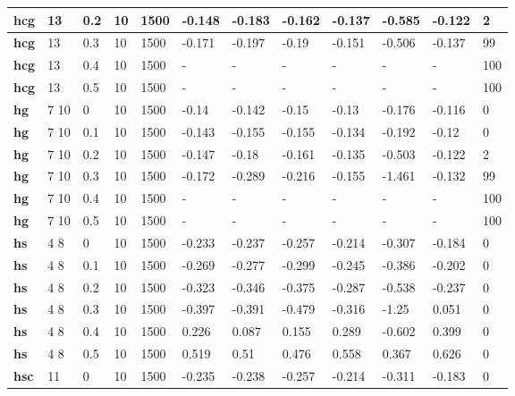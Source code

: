 \begin{longtable}[h]{|p{0.8cm}|p{1.5cm}|p{1cm}|p{1cm}|p{1cm}|p{1cm}|p{1cm}|p{1cm}|p{1cm}|p{1cm}|p{1cm}|p{1.5cm}|}
    \\ \hline
  \textbf{hcg } &  13         & 0.2 & 10 & 1500 & -0.148 & -0.183 & -0.162 & -0.137 & -0.585 & -0.122 &   2
    \\ \hline
  \textbf{hcg } &  13         & 0.3 & 10 & 1500 & -0.171 & -0.197 &  -0.19 & -0.151 & -0.506 & -0.137 &  99
    \\ \hline
  \textbf{hcg } &  13         & 0.4 & 10 & 1500 & - & - & - & - & - & - & 100
    \\ \hline
  \textbf{hcg } &  13         & 0.5 & 10 & 1500 & - & - & - & - & - & - & 100
    \\ \hline
  \textbf{hg  } &  7 10       &   0 & 10 & 1500 &  -0.14 & -0.142 &  -0.15 &  -0.13 & -0.176 & -0.116 &   0
    \\ \hline
  \textbf{hg  } &  7 10       & 0.1 & 10 & 1500 & -0.143 & -0.155 & -0.155 & -0.134 & -0.192 &  -0.12 &   0
    \\ \hline
  \textbf{hg  } &  7 10       & 0.2 & 10 & 1500 & -0.147 &  -0.18 & -0.161 & -0.135 & -0.503 & -0.122 &   2
    \\ \hline
  \textbf{hg  } &  7 10       & 0.3 & 10 & 1500 & -0.172 & -0.289 & -0.216 & -0.155 & -1.461 & -0.132 &  99
    \\ \hline
  \textbf{hg  } &  7 10       & 0.4 & 10 & 1500 & - & - & - & - & - & - & 100
    \\ \hline
  \textbf{hg  } &  7 10       & 0.5 & 10 & 1500 & - & - & - & - & - & - & 100
    \\ \hline
  \textbf{hs  } &  4 8        &   0 & 10 & 1500 & -0.233 & -0.237 & -0.257 & -0.214 & -0.307 & -0.184 &   0
    \\ \hline
  \textbf{hs  } &  4 8        & 0.1 & 10 & 1500 & -0.269 & -0.277 & -0.299 & -0.245 & -0.386 & -0.202 &   0
    \\ \hline
  \textbf{hs  } &  4 8        & 0.2 & 10 & 1500 & -0.323 & -0.346 & -0.375 & -0.287 & -0.538 & -0.237 &   0
    \\ \hline
  \textbf{hs  } &  4 8        & 0.3 & 10 & 1500 & -0.397 & -0.391 & -0.479 & -0.316 &  -1.25 &  0.051 &   0
    \\ \hline
  \textbf{hs  } &  4 8        & 0.4 & 10 & 1500 &  0.226 &  0.087 &  0.155 &  0.289 & -0.602 &  0.399 &   0
    \\ \hline
  \textbf{hs  } &  4 8        & 0.5 & 10 & 1500 &  0.519 &   0.51 &  0.476 &  0.558 &  0.367 &  0.626 &   0
    \\ \hline
  \textbf{hsc } &  11         &   0 & 10 & 1500 & -0.235 & -0.238 & -0.257 & -0.214 & -0.311 & -0.183 &   0

\end{longtable}
